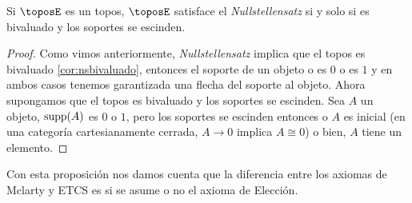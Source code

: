 \begin{theorem}
    Si $\toposE$ es un topos, $\toposE$ satisface el \textit{Nullstellensatz} si y solo si es bivaluado y los soportes se escinden.
\end{theorem}
\begin{proof}
    Como vimos anteriormente, \textit{Nullstellensatz} implica que el topos es bivaluado \ref{cor:nsbivaluado}, entonces
    el soporte de un objeto o es $0$ o es $1$ y en ambos casos tenemos garantizada una flecha del soporte al objeto.
    Ahora supongamos que el topos es bivaluado y los soportes se escinden. Sea $A$ un objeto,
    $\operatorname{supp}(A)$ es $0$ o $1$, pero los soportes se escinden entonces o $A$ es inicial (en una 
    categoría cartesianamente cerrada, $A\to 0$ implica $A\cong 0$) o bien, $A$ tiene un elemento. 
\end{proof}

Con esta proposición nos damos cuenta que la diferencia entre los axiomas de Mclarty y ETCS es si 
se asume o no el axioma de Elección.

